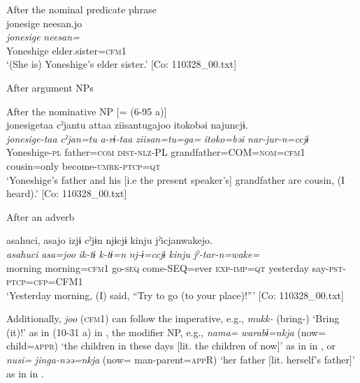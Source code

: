 \begin{xlist}
   \ex After the nominal predicate phrase\\
      \glll    jonesige  {\textbar}neesan{\textbar}.jo\\
      \textit{jonesige}  \textit{neesan=}\\
      Yoneshige  elder.sister=\textsc{cfm}1\\
      \glt       ‘(She is) Yoneshige’s elder sister.’ [Co: 110328\_00.txt]

  \exi{} After argument NPs

  \ex  After the nominative NP [= (6-95 a)]\\
      \glll    jonesigetaa  cˀjantu  attaa  ziisantugajoo   {\textbar}itoko{\textbar}bəi  najuncjɨ.\\                                                                                             
      \textit{jonesige-taa}  \textit{cˀjan=tu}  \textit{a-rɨ-taa}  \textit{ziisan=tu=ga=} \textit{itoko=bəi}  \textit{nar-jur-n=ccjɨ}\\                                                                                             
      Yoneshige-\textsc{pl}  father=\textsc{com}  \textsc{dist}-\textsc{nlz}-PL  grandfather=COM=\textsc{nom}=\textsc{cfm}1   cousin=only  become-\textsc{umrk}-\textsc{ptcp}=\textsc{qt}\\
      \glt ‘Yoneshige’s father and his [i.e the present speaker’s] grandfather are cousin, (I heard).’ [Co: 110328\_00.txt]

  \exi{} After an adverb

  \ex  %
      \glll    asahuci,  asajo  izjɨ  cˀjɨn  njɨcjɨ  kinju  jˀicjanwakejo.\\                                                                                              
      \textit{asahuci}  \textit{asa=joo}  \textit{ik-tɨ}  \textit{k-tɨ=n}  \textit{nj-ɨ=ccjɨ} \textit{kinju}  \textit{jˀ-tar-n=wake=}\\                                                                                              
      morning  morning=\textsc{cfm}1  go-\textsc{seq}  come-SEQ=ever  \textsc{exp}-\textsc{imp}=\textsc{qt}   yesterday  say-\textsc{pst}-\textsc{ptcp}=\textsc{cfp}=CFM1\\
      \glt ‘Yesterday morning, (I) said, “Try to go (to your place)!”’      [Co: 110328\_00.txt]
    \end{xlist}
\z

Additionally, \textit{joo} (\textsc{cfm}1) can follow the imperative, e.g., \textit{mukk-} (bring-) ‘Bring (it)!’ as in (10-31 a) in , the modifier NP, e.g., \textit{nama=} \textit{warabɨ=nkja} (now= child=\textsc{appr}) ‘the children in these days [lit. the children of now]’ as in  in , or \textit{nusi=} \textit{jinga-nəə=nkja} (now= man-parent=\textsc{app}R) ‘her father [lit. herself’s father]’ as in  in .

